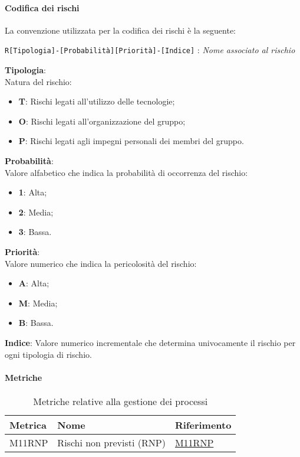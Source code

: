 \paragraph{Codifica dei rischi}
La convenzione utilizzata per la codifica dei rischi è la seguente: 
\begin{center}
    \texttt{R[Tipologia]-[Probabilità][Priorità]-[Indice]} : \textit{Nome associato al rischio}
\end{center} 

\begin{flushleft}
    \textbf{Tipologia}: \\
    Natura del rischio:
    \begin{itemize}
        \item \textbf{T}: Rischi legati all'utilizzo delle tecnologie;
        \item \textbf{O}: Rischi legati all'organizzazione del gruppo;
        \item \textbf{P}: Rischi legati agli impegni personali dei membri del gruppo.
    \end{itemize}
    \textbf{Probabilità}: \\
    Valore alfabetico che indica la probabilità di occorrenza del rischio:
    \begin{itemize}
        \item \textbf{1}: Alta;
        \item \textbf{2}: Media; 
        \item \textbf{3}: Bassa.
    \end{itemize}
    \textbf{Priorità}: \\
    Valore numerico che indica la pericolosità del rischio:
    \begin{itemize}
        \item \textbf{A}: Alta;
        \item \textbf{M}: Media;
        \item \textbf{B}: Bassa.
    \end{itemize}
    \textbf{Indice}: Valore numerico incrementale che determina univocamente il rischio per ogni tipologia di rischio. 
\end{flushleft}

\paragraph{Metriche}
\begin{table}[H]
  \centering
  \begin{tabular}{|C{3cm}|C{3cm}|C{4cm}|}
  \hline
  Metrica & Nome & Riferimento \\
  \hline \hline
  M11RNP & Rischi non previsti (RNP) &  \hyperlink{item:M11RNP}{M11RNP}\\ 
  \hline
  \end{tabular}
  \caption{Metriche relative alla gestione dei processi}
\end{table}


